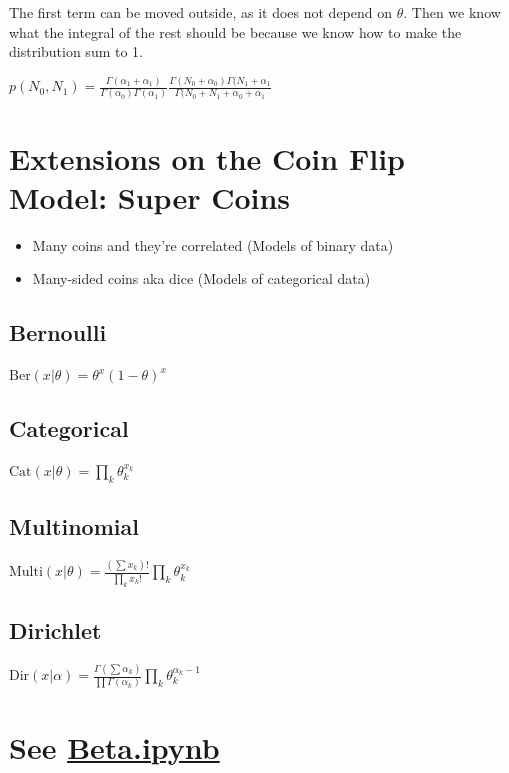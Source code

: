 \documentclass[twoside]{article}
\begin{document}
The first term can be moved outside, as it does not depend on $\theta$. Then we know what the integral of the rest should be because we know how to make the distribution sum to 1.

$p(N_0, N_1) = \frac{\Gamma( \alpha_1 +  \alpha_1)}{\Gamma(\alpha_0)\Gamma(\alpha_1)} \frac{\Gamma(N_0 + \alpha_0)\Gamma(N_1 + \alpha_1}{\Gamma(N_0 + N_1 + \alpha_0 + \alpha_1}$

\section{Extensions on the Coin Flip Model: Super Coins}
\begin{itemize}
\item Many coins and they're correlated (Models of binary data)
\item Many-sided coins aka dice (Models of categorical data)
\end{itemize}

\subsection{Bernoulli}
$\textrm{Ber}(x|\theta) = \theta^{x}(1-\theta)^x$
\subsection{Categorical}
$\textrm{Cat}(x|\theta) = \prod_k\theta_k^{x_k}$
\subsection{Multinomial}
$\textrm{Multi}(x|\theta) = \frac{(\sum x_k) !}{\prod_k x_k!}\prod_k\theta_k^{x_k}$
\subsection{Dirichlet}
$\textrm{Dir}(x|\alpha) = \frac{\Gamma(\sum \alpha_k)}{\prod \Gamma(\alpha_k)}\prod_k\theta_k^{\alpha_k-1}$

\section{See \href{https://github.com/harvard-ml-courses/cs281-demos/blob/master/Beta.ipynb}{Beta.ipynb}}
\end{document}
